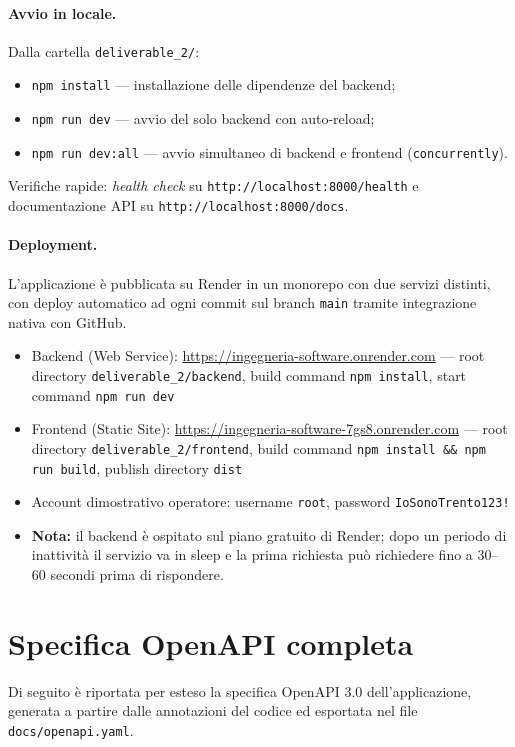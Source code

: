 \documentclass{article}
\newcommand{\code}[1]{\texttt{\small #1}}
\begin{document}
\paragraph{Avvio in locale.}
Dalla cartella \code{deliverable\_2/}:
\begin{itemize}
	\item \code{npm install} --- installazione delle dipendenze del backend;
	\item \code{npm run dev} --- avvio del solo backend con auto-reload;
	\item \code{npm run dev:all} --- avvio simultaneo di backend e frontend (\code{concurrently}).
\end{itemize}
Verifiche rapide: \textit{health check} su \code{http://localhost:8000/health} e
documentazione API su \code{http://localhost:8000/docs}.

\paragraph{Deployment.}
L'applicazione è pubblicata su Render in un monorepo con due servizi distinti,
con deploy automatico ad ogni commit sul branch \code{main} tramite integrazione
nativa con GitHub.

\begin{itemize}
  \item Backend (Web Service): \url{https://ingegneria-software.onrender.com} —
        root directory \texttt{deliverable\_2/backend},
        build command \texttt{npm install},
        start command \texttt{npm run dev}
  \item Frontend (Static Site): \url{https://ingegneria-software-7gs8.onrender.com} —
        root directory \texttt{deliverable\_2/frontend},
        build command \texttt{npm install \&\& npm run build},
        publish directory \texttt{dist}
  \item Account dimostrativo operatore: username \texttt{root}, password \texttt{IoSonoTrento123!}
  \item \textbf{Nota:} il backend è ospitato sul piano gratuito di Render; dopo un periodo
        di inattività il servizio va in sleep e la prima richiesta può richiedere fino a
        30--60 secondi prima di rispondere.
\end{itemize}

\newpage
\appendix
\section{Specifica OpenAPI completa}
\label{app:openapi}

Di seguito è riportata per esteso la specifica OpenAPI 3.0 dell'applicazione, generata a
partire dalle annotazioni del codice ed esportata nel file \code{docs/openapi.yaml}.


\end{document}
